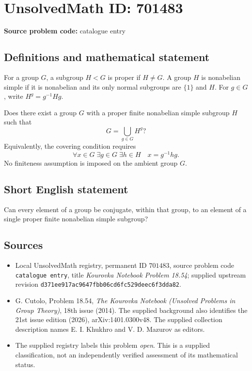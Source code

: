 \documentclass[11pt]{article}
\begin{document}
\section*{UnsolvedMath ID: 701483}
\textbf{Source problem code:} catalogue entry
\subsection{Definitions and mathematical statement}
For a group \(G\), a subgroup \(H<G\) is proper if \(H\ne G\). A group \(H\) is nonabelian simple if it is nonabelian and its only normal subgroups are \(\{1\}\) and \(H\). For \(g\in G\), write \(H^g=g^{-1}Hg\).

Does there exist a group \(G\) with a proper finite nonabelian simple subgroup \(H\) such that
\[
G=\bigcup_{g\in G}H^g?
\]
Equivalently, the covering condition requires
\[
\forall x\in G\;\exists g\in G\;\exists h\in H\quad x=g^{-1}hg.
\]
No finiteness assumption is imposed on the ambient group \(G\).
\subsection{Short English statement}
Can every element of a group be conjugate, within that group, to an element of a single proper finite nonabelian simple subgroup?
\subsection{Sources}
\begin{itemize}
\item Local UnsolvedMath registry, permanent ID \(701483\), source problem code \texttt{catalogue entry}, title \emph{Kourovka Notebook Problem 18.54}; supplied upstream revision \texttt{d371ee917ac9647fbb06cd6fc529deec6f3dda82}.
\item G. Cutolo, Problem 18.54, \emph{The Kourovka Notebook (Unsolved Problems in Group Theory)}, 18th issue (2014). The supplied background also identifies the 21st issue edition (2026), arXiv:1401.0300v48. The supplied collection description names E. I. Khukhro and V. D. Mazurov as editors.
\item The supplied registry labels this problem \emph{open}. This is a supplied classification, not an independently verified assessment of its mathematical status.
\end{itemize}
\end{document}
